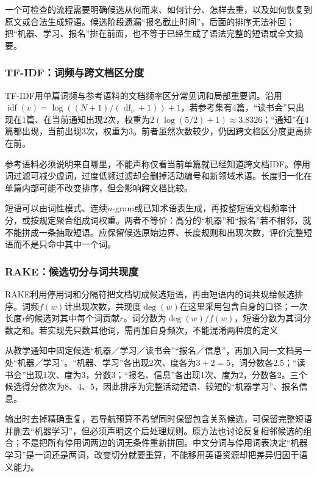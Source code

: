 一个可检查的流程需要明确候选从何而来、如何计分、怎样去重，以及如何恢复到原文或合法生成短语。候选阶段遗漏“报名截止时间”，后面的排序无法补回；把“机器、学习、报名”排在前面，也不等于已经生成了语法完整的短语或全文摘要。

\subsubsection{TF-IDF：词频与跨文档区分度}
\label{sec:nlp-classification-keyword-tfidf}

TF-IDF用单篇词频与参考语料的文档频率区分常见词和局部重要词。沿用$\operatorname{idf}(v)=\log((N+1)/(\operatorname{df}_v+1))+1$，若参考集有4篇，“读书会”只出现在1篇、在当前通知出现2次，权重为$2(\log(5/2)+1)\approx3.8326$；“通知”在4篇都出现，当前出现3次，权重为3。前者虽然次数较少，仍因跨文档区分度更高排在前。

参考语料必须说明来自哪里，不能声称仅看当前单篇就已经知道跨文档IDF。停用词过滤可减少虚词，过度低频过滤却会删掉活动编号和新领域术语。长度归一化在单篇内部可能不改变排序，但会影响跨文档比较。

短语可以由词性模式、连续$n$-gram或已知术语表生成，再按整短语文档频率计分，或按规定聚合组成词权重。两者不等价：高分的“机器”和“报名”若不相邻，就不能拼成一条抽取短语。应保留候选原始边界、长度规则和出现次数，评价完整短语而不是只命中其中一个词。

\subsubsection{RAKE：候选切分与词共现度}
\label{sec:nlp-classification-rake}

RAKE利用停用词和分隔符把文档切成候选短语，再由短语内的词共现给候选排序。词频$f(w)$计出现次数，共现度$\deg(w)$在这里采用包含自身的口径；一次长度$r$的候选对其中每个词贡献$r$。词分数为$\deg(w)/f(w)$，短语分数为其词分数之和。若实现先只数其他词，需再加自身频次，不能混淆两种度的定义

从教学通知中固定候选“机器／学习／读书会”“报名／信息”，再加入同一文档另一处“机器／学习”。“机器、学习”各出现2次、度各为$3+2=5$，词分数各2.5；“读书会”出现1次、度为3，分数3；“报名、信息”各出现1次、度为2，分数各2。三个候选得分依次为8、4、5，因此排序为完整活动短语、较短的“机器学习”、报名信息。

输出时去掉精确重复，若导航预算不希望同时保留包含关系候选，可保留完整短语并删去“机器学习”，但必须声明这个后处理规则。原方法也讨论反复相邻候选的组合；不是把所有停用词两边的词无条件重新拼回。中文分词与停用词表决定“机器学习”是一词还是两词，改变切分就要重算，不能移用英语资源却把差异归因于语义能力。

